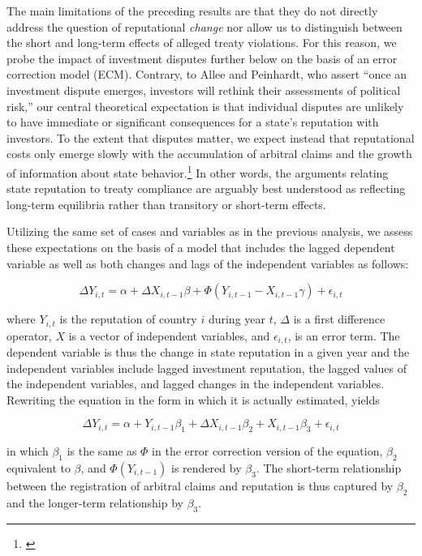 \documentclass[12pt,onesided]{amsart}
\begin{document}
The main limitations of the preceding results are that they do not directly address the question of reputational \textit{change} nor allow us to distinguish between the short and long-term effects of alleged treaty violations. For this reason, we probe the impact of investment disputes further below on the basis of an error correction model (ECM). Contrary, to Allee and Peinhardt, who assert ``once an investment dispute emerges, investors will rethink their assessments of political risk,'' our central theoretical expectation is that individual disputes are unlikely to have immediate or significant consequences for a state's reputation with investors. To the extent that disputes matter, we expect instead that reputational costs only emerge slowly with the accumulation of arbitral claims and the growth of information about state behavior.\footnote{\citet[p. 402]{allee:peinhardt:2011}} In other words, the arguments relating state reputation to treaty compliance are arguably best understood as reflecting long-term equilibria rather than transitory or short-term effects.

Utilizing the same set of cases and variables as in the previous analysis, we assess these expectations on the basis of a model that includes the lagged dependent variable as well as both changes and lags of the independent variables as follows:

\begin{equation}
\Delta Y_{i,t} = \alpha + \Delta X_{i,t-1} \beta + \Phi(Y_{i,t-1} - X_{i,t-1} \gamma) + \epsilon_{i,t}
\end{equation}

where $Y_{i,t}$ is the reputation of country $i$ during year $t$, $\Delta$ is a first difference operator, $X$ is a vector of independent variables, and $\epsilon_{i,t}$, is an error term. The dependent variable is thus the change in state reputation in a given year and the independent variables include lagged investment reputation, the lagged values of the independent variables, and lagged changes in the independent variables. Rewriting the equation in the form in which it is actually estimated, yields

\begin{equation}
\Delta Y_{i,t} = \alpha + Y_{i,t-1} \beta_{1} + \Delta X_{i,t-1} \beta_{2} + X_{i, t-1} \beta_{3} + \epsilon_{i,t}
\end{equation}

in which $\beta_{1}$ is the same as $\Phi$ in the error correction version of the equation, $\beta_{2}$ equivalent to $\beta$, and $\Phi(Y_{i,t-1})$ is rendered by $\beta_{3}$. The short-term relationship between the registration of arbitral claims and reputation is thus captured by $\beta_{2}$  and the longer-term relationship by $\beta_{3}$.
\end{document}
